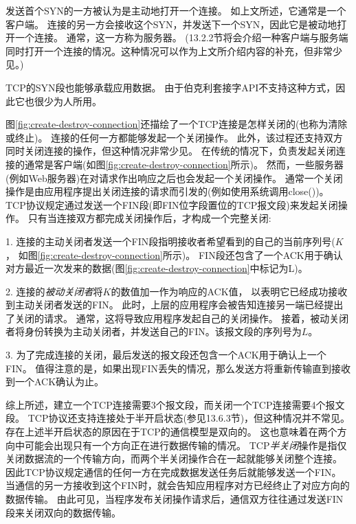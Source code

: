 \documentclass{../main.tex}{subfiles}
\begin{document}
发送首个SYN的一方被认为是主动地打开一个连接。
如上文所述，它通常是一个客户端。
连接的另一方会接收这个SYN，并发送下一个SYN，因此它是被动地打开一个连接。
通常，这一方称为服务器。
(13.2.2节将会介绍一种客户端与服务端同时打开一个连接的情况。这种情况可以作为上文所介绍内容的补充，但非常少见。)

\begin{tcolorbox}[title={注意}]
  TCP的SYN段也能够承载应用数据。
  由于伯克利套接字API不支持这种方式，因此它也很少为人所用。
\end{tcolorbox}

图\ref{fig:create-destroy-connection}还描绘了一个TCP连接是怎样关闭的(也称为清除或终止)。
连接的任何一方都能够发起一个关闭操作。
此外，该过程还支持双方同时关闭连接的操作，但这种情况非常少见。
在传统的情况下，负责发起关闭连接的通常是客户端(如图\ref{fig:create-destroy-connection}所示)。
然而，一些服务器(例如Web服务器)在对请求作出响应之后也会发起一个关闭操作。
通常一个关闭操作是由应用程序提出关闭连接的请求而引发的(例如使用系统调用close())。
TCP协议规定通过发送一个FIN段(即FIN位字段置位的TCP报文段)来发起关闭操作。
只有当连接双方都完成关闭操作后，才构成一个完整关闭:

1. 连接的主动关闭者发送一个FIN段指明接收者希望看到的自己的当前序列号($K$，
如图\ref{fig:create-destroy-connection}所示)。
FIN段还包含了一个ACK用于确认对方最近一次发来的数据(图\ref{fig:create-destroy-connection}中标记为L)。

2. 连接的\emph{被动关闭者}将$K$的数值加一作为响应的ACK值，
以表明它已经成功接收到主动关闭者发送的FIN。
此时，上层的应用程序会被告知连接另一端已经提出了关闭的请求。
通常，这将导致应用程序发起自己的关闭操作。
接着，被动关闭者将身份转换为主动关闭者，并发送自己的FIN。该报文段的序列号为$L$。

3. 为了完成连接的关闭，最后发送的报文段还包含一个ACK用于确认上一个FIN。
值得注意的是，如果出现FIN丢失的情况，那么发送方将重新传输直到接收到一个ACK确认为止。

综上所述，建立一个TCP连接需要3个报文段，而关闭一个TCP连接需要4个报文段。
TCP协议还支持连接处于半开启状态(参见13.6.3节)，但这种情况并不常见。
存在上述半开启状态的原因在于TCP的通信模型是双向的。
这也意味着在两个方向中可能会出现只有一个方向正在进行数据传输的情况。
TCP\emph{半关闭}操作是指仅关闭数据流的一个传输方向，而两个半关闭操作合在一起就能够关闭整个连接。
因此TCP协议规定通信的任何一方在完成数据发送任务后就能够发送一个FIN。
当通信的另一方接收到这个FIN时，就会告知应用程序对方已经终止了对应方向的数据传输。
由此可见，当程序发布关闭操作请求后，通信双方往往通过发送FIN段来关闭双向的数据传输。
\end{document}
